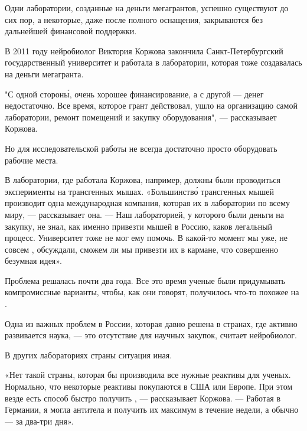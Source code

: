 Одни лаборатории, созданные на деньги мегагрантов, успешно существуют до сих пор, а некоторые, даже после полного оснащения, закрываются без дальнейшей финансовой поддержки.

В 2011 году нейробиолог Виктория Коржова закончила Санкт-Петербургский государственный университет и работала в лаборатории, которая тоже создавалась на деньги мегагранта.


"С одной сторон\'{ы}, очень хорошее финансирование, а с другой --- денег недостаточно. Все время, которое грант действовал, ушло на организацию самой лаборатории, ремонт помещений и закупку оборудования", --- рассказывает Коржова.

Но для исследовательской работы не всегда достаточно просто оборудовать рабочие места.

В лаборатории, где работала Коржова, например, должны были проводиться эксперименты на трансгенных мышах. «Большинств\'{о} трансгенных мышей производит одна международная компания, которая  их в лаборатории по всему миру, --- рассказывает она. --- Наш  лабораторией, у которого были деньги на закупку, не знал, как именно привезти мышей в Россию, каков легальный процесс. Университет тоже не мог ему помочь. В какой-то момент мы уже, не совсем , обсуждали, сможем ли мы привезти их в кармане, что совершенно безумная идея».

Проблема решалась почти два года. Все это время ученые были  придумывать компромиссные варианты, чтобы, как они говорят, получилось что-то похожее на  .

Одна из важных проблем в России, которая давно решена в странах, где активно развивается наука, --- это отсутствие   для научных закупок, считает нейробиолог.

В других лабораториях страны ситуация иная.

«Нет такой страны, которая бы производила все нужные реактивы для ученых. Нормально, что некоторые реактивы покупаются в США или Европе. При этом везде есть способ быстро получить , --- рассказывает Коржова. --- Работая в Германии, я могла  антитела и получить их максимум в течение недели, а обычно --- за два-три дня».


